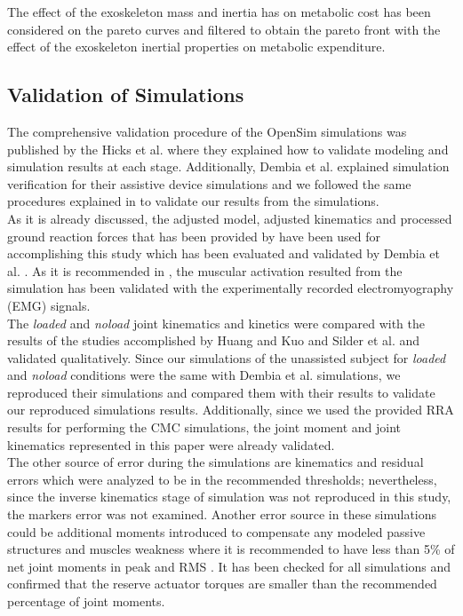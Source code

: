 \documentclass[10pt,letterpaper]{article}
\begin{document}
The effect of the exoskeleton mass and inertia has on metabolic cost has been considered on the pareto curves and filtered to obtain the pareto front with the effect of the exoskeleton inertial properties on metabolic expenditure.
\subsection*{Validation of Simulations}
The comprehensive validation procedure of the OpenSim simulations was published by the Hicks et al. \cite{92} where they explained how to validate modeling and simulation results at each stage. Additionally, Dembia et al. \cite{93} explained simulation verification for their assistive device simulations and we followed the same procedures explained in \cite{92,93} to validate our results from the simulations.\\
As it is already discussed, the adjusted model, adjusted kinematics and processed ground reaction forces that has been provided by \cite{93} have been used for accomplishing this study which has been evaluated and validated by Dembia et al. \cite{93}. As it is recommended in \cite{92}, the muscular activation resulted from the simulation has been validated with the experimentally recorded electromyography (EMG) signals.\\
The \textit{loaded} and \textit{\textit{noload}} joint kinematics and kinetics were compared with the results of the studies accomplished by Huang and Kuo \cite{131} and Silder et al.\cite{132} and validated qualitatively. Since our simulations of the unassisted subject for \textit{loaded} and \textit{noload} conditions were the same with Dembia et al. simulations, we reproduced their simulations and compared them with their results to validate our reproduced simulations results. Additionally, since we used the provided RRA results for performing the CMC simulations, the joint moment and joint kinematics represented in this paper were already validated.\\
The other source of error during the simulations are kinematics and residual errors which were analyzed to be in the recommended thresholds\cite{92}; nevertheless, since the inverse kinematics stage of simulation was not reproduced in this study, the markers error was not examined. Another error source in these simulations could be additional moments introduced to compensate any modeled passive structures and muscles weakness where it is recommended to have less than 5\% of net joint moments in peak and RMS \cite{92}. It has been checked for all simulations and confirmed that the reserve actuator torques are smaller than the recommended percentage of joint moments.
\end{document}
